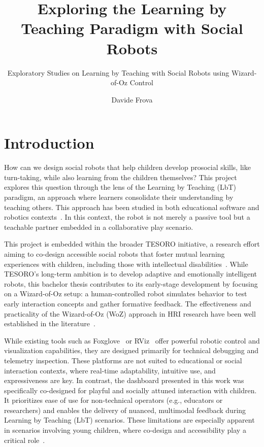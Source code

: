 \documentclass[a4paper]{usiinfbachelorproject}
\author{Davide Frova}
\title{\textbf{Exploring the Learning by Teaching Paradigm with Social Robots}}
\subtitle{Exploratory Studies on Learning by Teaching with Social Robots using Wizard-of-Oz Control}
\begin{document}
\maketitle
\tableofcontents\newpage

\section{\textbf{Introduction}}

How can we design social robots that help children develop prosocial skills, like turn-taking, while also learning from the children themselves?
This project explores this question through the lens of the Learning by Teaching (LbT) paradigm, an approach where learners consolidate their understanding by teaching others.
This approach has been studied in both educational software and robotics contexts~\cite{biswas2005learning, 10.5898/JHRI.1.1.Tanaka}.
In this context, the robot is not merely a passive tool but a teachable partner embedded in a collaborative play scenario.

This project is embedded within the broader TESORO initiative, a research effort aiming to co-design accessible social robots that foster mutual learning experiences with children, including those with intellectual disabilities~\cite{landoni2025tesoro}.
While TESORO's long-term ambition is to develop adaptive and emotionally intelligent robots, this bachelor thesis contributes to its early-stage development by focusing on a Wizard-of-Oz setup: a human-controlled robot simulates behavior to test early interaction concepts and gather formative feedback.
The effectiveness and practicality of the Wizard-of-Oz (WoZ) approach in HRI research have been well established in the literature~\cite{weiss2010userWOZ, rietz2021woz4uPepper, SCHOONDERWOERD2022102831}.

While existing tools such as Foxglove~\cite{foxglove} or RViz~\cite{rviz2} offer powerful robotic control and visualization capabilities, they are designed primarily for technical debugging and telemetry inspection.
These platforms are not suited to educational or social interaction contexts, where real-time adaptability, intuitive use, and expressiveness are key.
In contrast, the dashboard presented in this work was specifically co-designed for playful and socially attuned interaction with children.
It prioritizes ease of use for non-technical operators (e.g., educators or researchers) and enables the delivery of nuanced, multimodal feedback during Learning by Teaching (LbT) scenarios.
These limitations are especially apparent in scenarios involving young children, where co-design and accessibility play a critical role~\cite{osti_10386132, rose2019participatory}.
\end{document}
